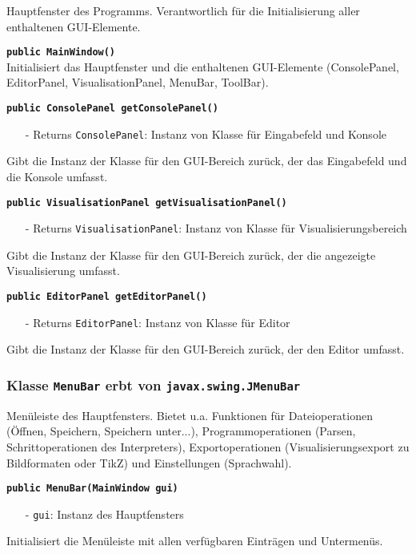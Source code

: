 \documentclass[parskip=full,11pt,twoside]{scrartcl}
\begin{document}
Hauptfenster des Programms. Verantwortlich für die Initialisierung aller enthaltenen GUI-Elemente.

\textbf{\texttt{public MainWindow()}}\\
Initialisiert das Hauptfenster und die enthaltenen GUI-Elemente (ConsolePanel, EditorPanel, VisualisationPanel, MenuBar, ToolBar).

\textbf{\texttt{public ConsolePanel getConsolePanel()}}
\begin{itemize}[noitemsep]
	\item[-] Returns \texttt{ConsolePanel}: Instanz von Klasse für Eingabefeld und Konsole
\end{itemize}
Gibt die Instanz der Klasse für den GUI-Bereich zurück, der das Eingabefeld und die Konsole umfasst.

\textbf{\texttt{public VisualisationPanel getVisualisationPanel()}}
\begin{itemize}[noitemsep]
	\item[-] Returns \texttt{VisualisationPanel}: Instanz von Klasse für Visualisierungsbereich
\end{itemize}
Gibt die Instanz der Klasse für den GUI-Bereich zurück, der die angezeigte Visualisierung umfasst.

\textbf{\texttt{public EditorPanel getEditorPanel()}}
\begin{itemize}[noitemsep]
	\item[-] Returns \texttt{EditorPanel}: Instanz von Klasse für Editor
\end{itemize}
Gibt die Instanz der Klasse für den GUI-Bereich zurück, der den Editor umfasst.

\subsubsection{Klasse \texttt{MenuBar} erbt von \texttt{javax.swing.JMenuBar}}

Menüleiste des Hauptfensters. Bietet u.a. Funktionen für Dateioperationen (Öffnen, Speichern, Speichern unter...), Programmoperationen (Parsen, Schrittoperationen des Interpreters), Exportoperationen (Visualisierungsexport zu Bildformaten oder TikZ) und Einstellungen (Sprachwahl).

\textbf{\texttt{public MenuBar(MainWindow gui)}}
\begin{itemize}[noitemsep]
	\item[-] \texttt{gui}: Instanz des Hauptfensters
\end{itemize}
Initialisiert die Menüleiste mit allen verfügbaren Einträgen und Untermenüs.
\end{document}
